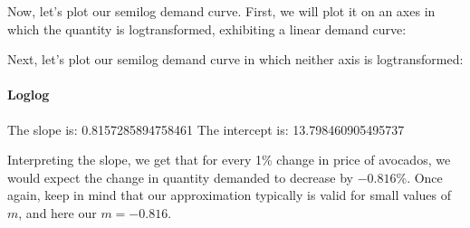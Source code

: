 \documentclass[letterpaper,10pt,english]{jupyterBook}
\begin{document}
\sphinxAtStartPar
Now, let’s plot our semi\sphinxhyphen{}log demand curve. First, we will plot it on an axes in which the quantity is log\sphinxhyphen{}transformed, exhibiting a linear demand curve:

\noindent{}

\sphinxAtStartPar
Next, let’s plot our semi\sphinxhyphen{}log demand curve in which neither axis is log\sphinxhyphen{}transformed:

\noindent{}


\paragraph{Log\sphinxhyphen{}log}
\label{\detokenize{content/01-demand/03-log-log:log-log}}
\begin{sphinxVerbatim}[commandchars=\\\{\}]
  
  

     
 
 
\end{sphinxVerbatim}

\begin{sphinxVerbatim}[commandchars=\\\{\}]
The slope is:  \PYGZhy{}0.8157285894758461
The intercept is:  13.798460905495737
\end{sphinxVerbatim}

\sphinxAtStartPar
Interpreting the slope, we get that for every 1\% change in price of avocados, we would expect the change in quantity demanded to decrease by \(-0.816\%\). Once again, keep in mind that our approximation typically is valid for small values of \(m\), and here our \(m=-0.816\).
\end{document}

